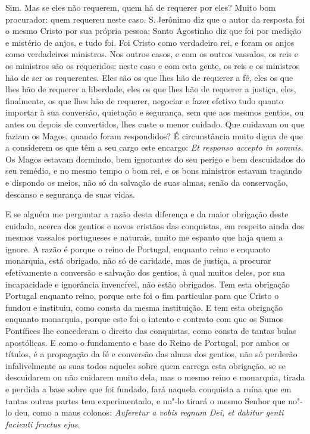 Sim. Mas se eles não requerem, quem há de requerer por eles? Muito bom
procurador: quem requereu neste caso. S.\,Jerônimo diz que o autor da
resposta foi o mesmo Cristo por sua própria pessoa; Santo Agostinho diz
que foi por medição e mistério de anjos, e tudo foi. Foi Cristo como
verdadeiro rei, e foram os anjos como verdadeiros ministros. Nos outros
casos, e com os outros vassalos, os reis e os ministros são os
requeridos: neste caso e com esta gente, os reis e os ministros hão de
ser os requerentes. Eles são os que lhes hão de requerer a fé, eles os
que lhes hão de requerer a liberdade, eles os que lhes hão de requerer a
justiça, eles, finalmente, os que lhes hão de requerer, negociar e fazer
efetivo tudo quanto importar à sua conversão, quietação e segurança, sem
que aos mesmos gentios, ou antes ou depois de convertidos, lhes custe o
menor cuidado. Que cuidavam ou que faziam os Magos, quando foram
respondidos? É circunstância muito digna de que a considerem os que têm
a seu cargo este encargo: \emph{Et responso accepto in somnis.} Os Magos
estavam dormindo, bem ignorantes do seu perigo e bem descuidados do seu
remédio, e no mesmo tempo o bom rei, e os bons ministros estavam
traçando e dispondo os meios, não só da salvação de suas almas, senão da
conservação, descanso e segurança de suas vidas.

E se alguém me perguntar a razão desta diferença e da maior obrigação
deste cuidado, acerca dos gentios e novos cristãos das conquistas, em
respeito ainda dos mesmos vassalos portugueses e naturais, muito me
espanto que haja quem a ignore. A razão é porque o reino de Portugal,
enquanto reino e enquanto monarquia, está obrigado, não só de caridade,
mas de justiça, a procurar efetivamente a conversão e salvação dos
gentios, à qual muitos deles, por sua incapacidade e ignorância
invencível, não estão obrigados. Tem esta obrigação Portugal enquanto
reino, porque este foi o fim particular para que Cristo o fundou e
instituiu, como consta da mesma instituição. E tem esta obrigação
enquanto monarquia, porque este foi o intento e contrato com que os
Sumos Pontífices lhe concederam o direito das conquistas, como consta de
tantas bulas apostólicas. E como o fundamento e base do Reino de
Portugal, por ambos os títulos, é a propagação da fé e conversão das
almas dos gentios, não só perderão infalivelmente as suas todos aqueles
sobre quem carrega esta obrigação, se se descuidarem ou não cuidarem
muito dela, mas o mesmo reino e monarquia, tirada e perdida a base sobre
que foi fundado, fará naquela conquista a ruína que em tantas outras
partes tem experimentado, e no"-lo tirará o mesmo Senhor que no"-lo deu,
como a maus colonos: \emph{Auferetur a vobis regnum Dei, et dabitur
genti facienti fructus ejus}.

